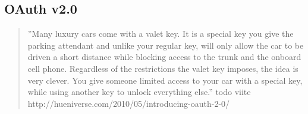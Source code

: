 \documentclass[finnish,gradu]{tktltiki}
\begin{document}


  \subsection{OAuth v2.0} %
  \label{sub:oauth}

  \begin{quote}
    ''Many luxury cars come with a valet key. It is a special key you give the parking attendant and unlike your regular key, will only allow the car to be driven a short distance while blocking access to the trunk and the onboard cell phone. Regardless of the restrictions the valet key imposes, the idea is very clever. You give someone limited access to your car with a special key, while using another key to unlock everything else.''
    todo viite http://hueniverse.com/2010/05/introducing-oauth-2-0/
  \end{quote}
\end{document}
